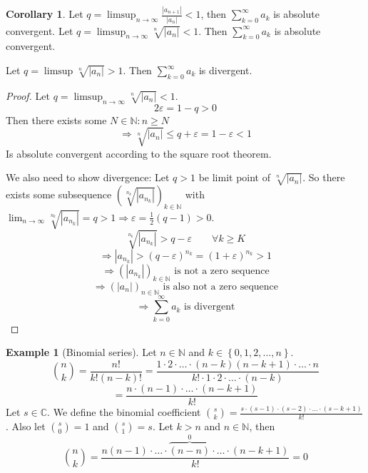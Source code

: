 \documentclass[a4paper,landscape,twocolumn]{article}
\theoremstyle{definition}
\newtheorem{ex}{Example}
\newtheorem{cor}{Corollary}
\newcommand\set[1]{\left\{#1\right\}}
\newcommand\abs[1]{\left|#1\right|}
\newcommand\seq[1]{{\left(#1\right)}_{n \in \mathbb N}}
\begin{document}
\begin{cor}
  Let $q = \limsup_{n\to\infty} \frac{\abs{a_{n+1}}}{\abs{a_n}} < 1$, then
  $\sum_{k=0}^\infty a_k$ is absolute convergent.
  Let $q = \limsup_{n\to\infty} \sqrt[n]{\abs{a_n}} < 1$.
  Then $\sum_{k=0}^\infty a_k$ is absolute convergent.

  Let $q = \limsup{\sqrt[n]{\abs{a_n}}} > 1$. Then $\sum_{k=0}^\infty a_k$ is divergent.
\end{cor}
\begin{proof}
  Let $q = \limsup_{n\to\infty} \sqrt[n]{\abs{a_n}} < 1$.
  \[ 2 \varepsilon = 1 - q > 0 \]
  Then there exists some $N \in \mathbb N: n \geq N$
  \[ \Rightarrow \sqrt[n]{\abs{a_n}} \leq q + \varepsilon = 1 - \varepsilon < 1 \]
  Is absolute convergent according to the square root theorem.

  We also need to show divergence: Let $q > 1$ be limit point of $\sqrt[n]{\abs{a_n}}$.
  So there exists some subsequence $\left(\sqrt[n_k]{\abs{a_{n_k}}}\right)_{k \in \mathbb N}$
  with $\lim_{n\to\infty} \sqrt[n_k]{\abs{a_{n_k}}} = q > 1 \Rightarrow \varepsilon = \frac12 \left(q - 1\right)
  > 0$.
  \[ \sqrt[n_k]{\abs{a_{n_k}}} > q - \varepsilon \qquad \forall k \geq K \]
  \[ \Rightarrow \abs{a_{n_k}} > (q - \varepsilon)^{n_k} = (1 + \varepsilon)^{n_k} > 1 \]
  \[ \Rightarrow \left(\abs{a_{n_k}}\right)_{k\in\mathbb N} \text{ is not a zero sequence} \]
  \[ \Rightarrow \seq{\abs{a_n}} \text{ is also not a zero sequence} \]
  \[ \Rightarrow \sum_{k=0}^\infty a_k \text{ is divergent} \]
\end{proof}

\begin{ex}[Binomial series]
  Let $n \in \mathbb N$ and $k \in \set{0,1,2,\dots,n}$.
  \[
    {n \choose k}
    = \frac{n!}{k! (n-k)!}
    = \frac{1 \cdot 2 \cdot \ldots \cdot (n-k)(n-k+1) \cdot \dots \cdot n}{k! \cdot 1 \cdot 2 \cdot \ldots \cdot (n-k)}
  \] \[
    = \frac{n \cdot (n-1) \cdot \ldots \cdot (n-k+1)}{k!}
  \]
  Let $s \in \mathbb C$. We define the binomial coefficient ${s \choose k}
  = \frac{s \cdot (s-1) \cdot (s-2) \cdot \ldots \cdot (s-k+1)}{k!}$.
  Also let ${s \choose 0} = 1$ and ${s \choose 1} = s$.
  Let $k > n$ and $n \in \mathbb N$, then
  \[ {n \choose k} = \frac{n (n-1) \cdot \ldots \cdot \overbrace{(n-n)}^{0} \cdot \ldots \cdot (n-k+1)}{k!} = 0 \]
\end{ex}
\end{document}
